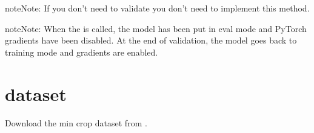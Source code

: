 \documentclass[letterpaper,10pt,english]{sphinxmanual}
\begin{document}
\begin{fulllineitems}
\begin{fulllineitems}
\begin{sphinxVerbatim}[commandchars=\\\{\}]
       
\end{sphinxVerbatim}

\begin{sphinxadmonition}{note}{Note:}
\sphinxAtStartPar
If you don’t need to validate you don’t need to implement this method.
\end{sphinxadmonition}

\begin{sphinxadmonition}{note}{Note:}
\sphinxAtStartPar
When the {\hyperref[\detokenize{train:train.PcrCNN.validation_step}]{}} is called, the model has been put in eval mode
and PyTorch gradients have been disabled. At the end of validation,
the model goes back to training mode and gradients are enabled.
\end{sphinxadmonition}

\end{fulllineitems}


\end{fulllineitems}


\begin{fulllineitems}
\label{\detokenize{train:train.main}}
\pysigstartsignatures
\pysiglinewithargsret
{}
{}
{}
\pysigstopsignatures
\end{fulllineitems}


\sphinxstepscope


\section{dataset}
\label{\detokenize{dataset:module-dataset}}\label{\detokenize{dataset:dataset}}\label{\detokenize{dataset::doc}}
\sphinxAtStartPar
Download the min crop dataset from .
\end{document}
